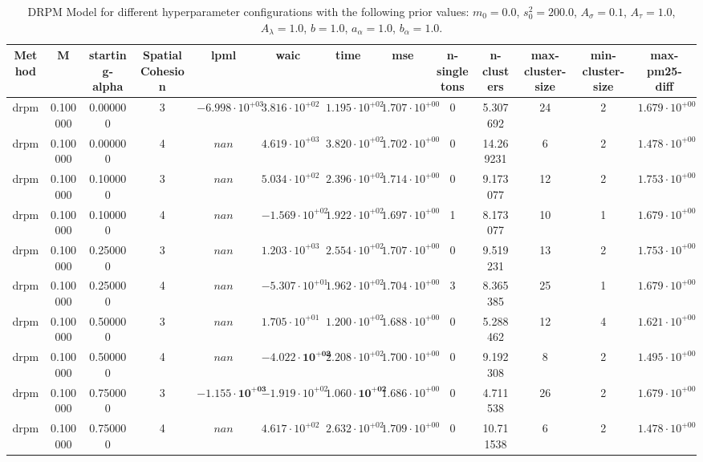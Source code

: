 \begin{table}
\caption{DRPM Model for different hyperparameter configurations with the following prior values: $m_0 = 0.0$, $s_0^2 = 200.0$, $A_\sigma = 0.1$, $A_\tau = 1.0$, $A_\lambda = 1.0$, $b = 1.0$, $a_\alpha = 1.0$, $b_\alpha = 1.0$.}
\centering
\begin{tabular}{ccccccccccccc}
\toprule
Method & M & starting-alpha & SpatialCohesion & lpml & waic & time & mse & n-singletons & n-clusters & max-cluster-size & min-cluster-size & max-pm25-diff \\
\midrule
drpm & 0.100000 & 0.000000 & 3 & $-6.998 \cdot 10^{+03}$ & $3.816 \cdot 10^{+02}$ & $1.195 \cdot 10^{+02}$ & $1.707 \cdot 10^{+00}$ & 0 & 5.307692 & 24 & 2 & $1.679 \cdot 10^{+00}$ \\
drpm & 0.100000 & 0.000000 & 4 & $nan$ & $4.619 \cdot 10^{+03}$ & $3.820 \cdot 10^{+02}$ & $1.702 \cdot 10^{+00}$ & 0 & 14.269231 & 6 & 2 & $1.478 \cdot 10^{+00}$ \\
drpm & 0.100000 & 0.100000 & 3 & $nan$ & $5.034 \cdot 10^{+02}$ & $2.396 \cdot 10^{+02}$ & $1.714 \cdot 10^{+00}$ & 0 & 9.173077 & 12 & 2 & $1.753 \cdot 10^{+00}$ \\
drpm & 0.100000 & 0.100000 & 4 & $nan$ & $-1.569 \cdot 10^{+02}$ & $1.922 \cdot 10^{+02}$ & $1.697 \cdot 10^{+00}$ & 1 & 8.173077 & 10 & 1 & $1.679 \cdot 10^{+00}$ \\
drpm & 0.100000 & 0.250000 & 3 & $nan$ & $1.203 \cdot 10^{+03}$ & $2.554 \cdot 10^{+02}$ & $1.707 \cdot 10^{+00}$ & 0 & 9.519231 & 13 & 2 & $1.753 \cdot 10^{+00}$ \\
drpm & 0.100000 & 0.250000 & 4 & $nan$ & $-5.307 \cdot 10^{+01}$ & $1.962 \cdot 10^{+02}$ & $1.704 \cdot 10^{+00}$ & 3 & 8.365385 & 25 & 1 & $1.679 \cdot 10^{+00}$ \\
drpm & 0.100000 & 0.500000 & 3 & $nan$ & $1.705 \cdot 10^{+01}$ & $1.200 \cdot 10^{+02}$ & $1.688 \cdot 10^{+00}$ & 0 & 5.288462 & 12 & 4 & $1.621 \cdot 10^{+00}$ \\
drpm & 0.100000 & 0.500000 & 4 & $nan$ & $\mathbf{-4.022 \cdot 10^{+02}}$ & $2.208 \cdot 10^{+02}$ & $1.700 \cdot 10^{+00}$ & 0 & 9.192308 & 8 & 2 & $1.495 \cdot 10^{+00}$ \\
drpm & 0.100000 & 0.750000 & 3 & $\mathbf{-1.155 \cdot 10^{+03}}$ & $-1.919 \cdot 10^{+02}$ & $\mathbf{1.060 \cdot 10^{+02}}$ & $1.686 \cdot 10^{+00}$ & 0 & 4.711538 & 26 & 2 & $1.679 \cdot 10^{+00}$ \\
drpm & 0.100000 & 0.750000 & 4 & $nan$ & $4.617 \cdot 10^{+02}$ & $2.632 \cdot 10^{+02}$ & $1.709 \cdot 10^{+00}$ & 0 & 10.711538 & 6 & 2 & $1.478 \cdot 10^{+00}$ \\

\end{tabular}
\end{table}
